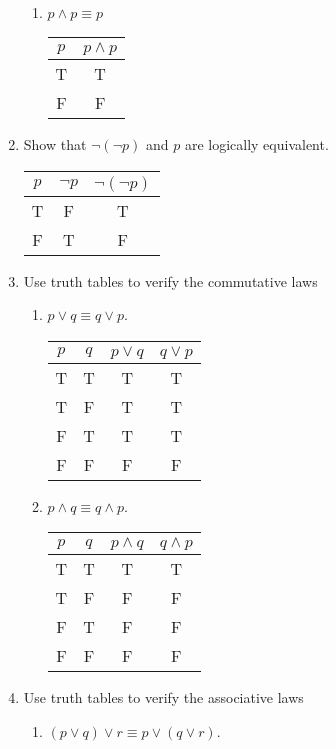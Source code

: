 \documentclass[11pt]{article}
\begin{document}
\begin{enumerate}[label=\textbf{\arabic*.}]
\begin{enumerate}[label=\textbf{\alph*)}]
		\item $p \land p \equiv p$
		
		\begin{tabular}{c | c}
			$p$ & $p \land p$ \\
			\hline
			T & T \\
			F & F 
		\end{tabular}
	\end{enumerate}

	\item Show that $\neg(\neg p)$ and $p$ are logically equivalent.
	
	\begin{tabular}{c | c | c}
		$p$ & $\neg p$ & $\neg(\neg p)$ \\
		\hline
		T & F & T \\
		F & T & F
	\end{tabular}

	\item Use truth tables to verify the commutative laws
	\begin{enumerate}[label=\textbf{\alph*)}]
		\item $p \lor q \equiv q \lor p$.
		
		\begin{tabular}{c | c | c | c}
			$p$ & $q$ & $p \lor q$ & $q \lor p$ \\
			\hline
			T & T & T & T \\
			T & F & T & T \\
			F & T & T & T \\
			F & F & F & F
		\end{tabular}
		
		\item $p \land q \equiv q \land p$.
		
		\begin{tabular}{c | c | c | c}
			$p$ & $q$ & $p \land q$ & $q \land p$ \\
			\hline
			T & T & T & T \\
			T & F & F & F \\
			F & T & F & F \\
			F & F & F & F
		\end{tabular}
	\end{enumerate}

	\item Use truth tables to verify the associative laws
	\begin{enumerate}[label=\textbf{\alph*)}]
		\item $(p \lor q) \lor r \equiv p \lor (q \lor r)$.
		

\end{enumerate}
\end{enumerate}
\end{document}
